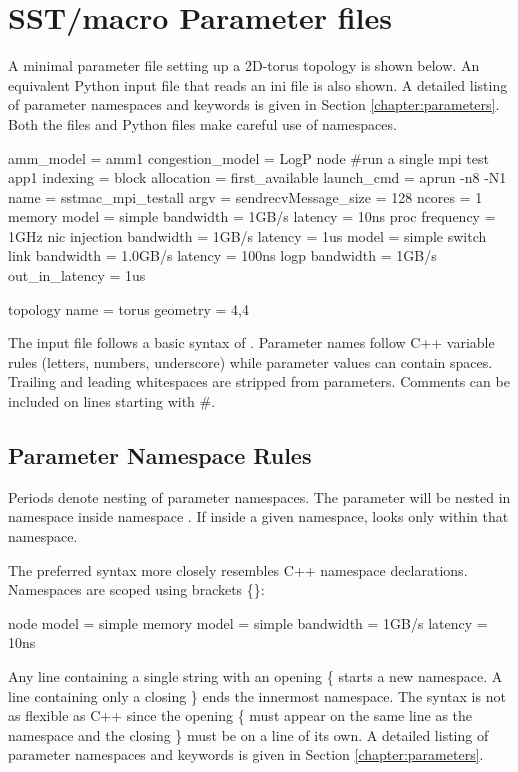
\section{SST/macro Parameter files}
\label{sec:parameters}
A minimal parameter file setting up a 2D-torus topology is shown below. 
An equivalent Python input file that reads an ini file is also shown.
A detailed listing of parameter namespaces and keywords is given in Section \ref{chapter:parameters}.
Both the  files and Python files make careful use of namespaces.

\begin{ViFile}
amm_model = amm1
congestion_model = LogP
node {
 #run a single mpi test
 app1 {
  indexing = block
  allocation = first_available
  launch_cmd = aprun -n8 -N1
  name = sstmac_mpi_testall
  argv =
  sendrecvMessage_size = 128
 }
 ncores = 1
 memory {
  model = simple
  bandwidth = 1GB/s
  latency = 10ns
 }
 proc {
  frequency = 1GHz
 }
 nic {
  injection {
   bandwidth = 1GB/s
   latency = 1us
  }
  model = simple
 }
}
switch {
 link {
  bandwidth = 1.0GB/s
   latency = 100ns
 }
 logp {
   bandwidth = 1GB/s
   out_in_latency = 1us
 }
}

topology {
 name = torus
 geometry = 4,4
}
\end{ViFile}
The input file follows a basic syntax of .  
Parameter names follow C++ variable rules (letters, numbers, underscore) while parameter values can contain spaces.  Trailing and leading whitespaces are stripped from parameters.
Comments can be included on lines starting with \#.

\subsection{Parameter Namespace Rules}
\label{subsec:parameterNamespace}
Periods denote nesting of parameter namespaces.
The parameter  will be nested in namespace  inside namespace .
If inside a given namespace, \sstmacro looks only within that namespace.

The preferred syntax more closely resembles C++ namespace declarations. 
Namespaces are scoped using brackets \{\}:

\begin{ViFile}
node {
 model = simple
 memory {
   model = simple
   bandwidth = 1GB/s
   latency = 10ns
 }
}
\end{ViFile}
Any line containing a single string with an opening \{ starts a new namespace.
A line containing only a closing \} ends the innermost namespace.
The syntax is not as flexible as C++ since the opening \{ must appear on the same line as the namespace and the closing \} must be on a line of its own.
A detailed listing of parameter namespaces and keywords is given in Section \ref{chapter:parameters}.

